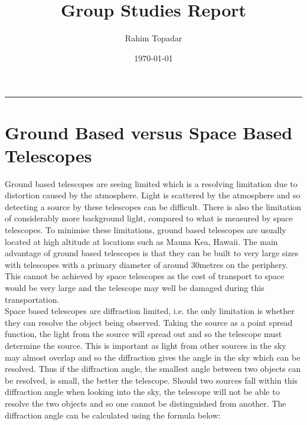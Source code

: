 \documentclass[pdf,color]{UoBnote}
\author{Rahim Topadar}
\title{Group Studies Report}
\date{\today}
\begin{document}
\maketitle
\tableofcontents
\vspace{1cm}\hrule \vspace{1cm}

\section{Ground Based versus Space Based Telescopes}
Ground based telescopes are seeing limited which is a resolving limitation due to distortion caused by the atmosphere. Light is scattered by the atmosphere and so detecting a source by these telescopes can be difficult. There is also the limitation of considerably more background light, compared to what is measured by space telescopes. To minimise these limitations, ground based telescopes are usually located at high altitude at locations such as Mauna Kea, Hawaii. The main advantage of ground based telescopes is that they can be built to very large sizes with telescopes with a primary diameter of around 30metres on the periphery. This cannot be achieved by space telescopes as the cost of transport to space would be very large and the telescope may well be damaged during this transportation.\\
\newline
Space based telescopes are diffraction limited, i.e. the only limitation is whether they can resolve the object being observed. Taking the source as a point spread function, the light from the source will spread out and so the telescope must determine the source. This is important as light from other sources in the sky may almost overlap and so the diffraction gives the angle in the sky which can be resolved. Thus if the diffraction angle, the smallest angle between two objects can be resolved, is small, the better the telescope. Should two sources fall within this diffraction angle when looking into the sky, the telescope will not be able to resolve the two objects and so one cannot be distinguished from another. The diffraction angle can be calculated using the formula below:
\end{document}
